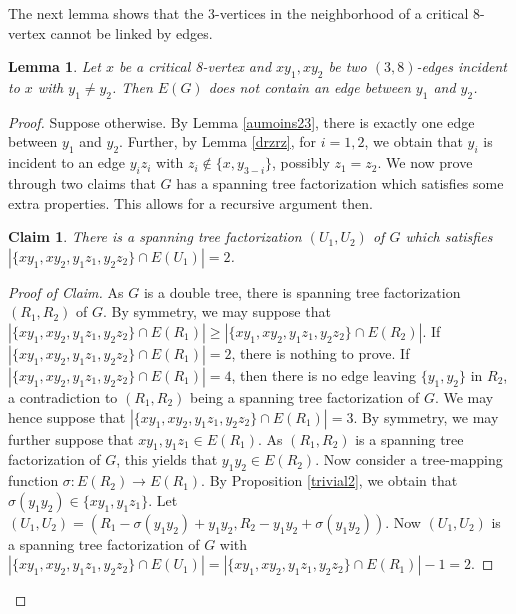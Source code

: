 \documentclass{article}
\theoremstyle{plain}
\newtheorem{Lemma}{Lemma}
\newtheorem{Claim}{Claim}
\theoremstyle{nonumberplain}
\theoremstyle{nonumberplain}
\newcommand{\stf}{spanning tree factorization }
\begin{document}
The next lemma shows that the 3-vertices in the neighborhood of a critical 8-vertex cannot be linked by edges. 
\begin{Lemma}\label{notadj}
Let $x$ be a critical 8-vertex and $xy_1,xy_2$ be two $(3,8)$-edges incident to $x$ with $y_1 \neq y_2$. Then $E(G)$ does not contain an edge between $y_1$ and $y_2$. 
\end{Lemma}
\begin{proof}
Suppose otherwise. By Lemma \ref{aumoins23}, there is exactly one edge between $y_1$ and $y_2$. Further, by Lemma \ref{drzrz}, for $i=1,2$, we obtain that $y_i$ is incident to an edge $y_iz_i$ with $z_i \notin \{x,y_{3-i}\}$, possibly $z_1=z_2$. We now prove through two claims that $G$ has a \stf which satisfies some extra properties. This allows for a recursive argument then.
\begin{Claim}\label{vgu}
There is a \stf $(U_1,U_2)$ of $G$ which satisfies $|\{xy_1,xy_2,y_1z_1,y_2z_2\}\cap E(U_1)|=2$.
\end{Claim}
\begin{proof}[Proof of Claim]
As $G$ is a double tree, there is \stf $(R_1,R_2)$ of $G$.
By symmetry, we may suppose that $|\{xy_1,xy_2,y_1z_1,y_2z_2\}\cap E(R_1)| \geq |\{xy_1,xy_2,y_1z_1,y_2z_2\}\cap E(R_2)|$. If $|\{xy_1,xy_2,y_1z_1,y_2z_2\}\cap E(R_1)|=2$, there is nothing to prove. If $|\{xy_1,xy_2,y_1z_1,y_2z_2\}\cap E(R_1)|=4$, then there is no edge leaving $\{y_1,y_2\}$ in $R_2$, a contradiction to $(R_1,R_2)$ being a \stf of $G$. We may hence suppose that $|\{xy_1,xy_2,y_1z_1,y_2z_2\}\cap E(R_1)|=3$. By symmetry, we may further suppose that $xy_1,y_1z_1\in E(R_1)$. As $(R_1,R_2)$ is a \stf of $G$, this yields that $y_1y_2 \in E(R_2)$. Now consider a tree-mapping function $\sigma:E(R_2)\rightarrow E(R_1)$. By Proposition \ref{trivial2}, we obtain that $\sigma(y_1y_2)\in \{xy_1,y_1z_1\}$. Let $(U_1,U_2)=(R_1-\sigma(y_1y_2)+y_1y_2,R_2-y_1y_2+\sigma(y_1y_2))$. Now $(U_1,U_2)$ is a \stf of $G$ with $|\{xy_1,xy_2,y_1z_1,y_2z_2\}\cap E(U_1)|=|\{xy_1,xy_2,y_1z_1,y_2z_2\}\cap E(R_1)|-1=2$.
\renewcommand{\qedsymbol}{$\blacksquare$}
\end{proof}


\end{proof}
\end{document}
